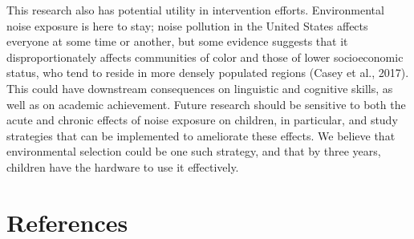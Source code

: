 \documentclass[10pt, letterpaper]{article}
\begin{document}
This research also has potential utility in intervention efforts.
Environmental noise exposure is here to stay; noise pollution in the
United States affects everyone at some time or another, but some
evidence suggests that it disproportionately affects communities of
color and those of lower socioeconomic status, who tend to reside in
more densely populated regions (Casey et al., 2017). This could have
downstream consequences on linguistic and cognitive skills, as well as
on academic achievement. Future research should be sensitive to both the
acute and chronic effects of noise exposure on children, in particular,
and study strategies that can be implemented to ameliorate these
effects. We believe that environmental selection could be one such
strategy, and that by three years, children have the hardware to use it
effectively.

\hypertarget{references}{%
\section{References}\label{references}}

\setlength{\parindent}{-0.1in} 
\setlength{\leftskip}{0.125in}

\noindent
\end{document}
